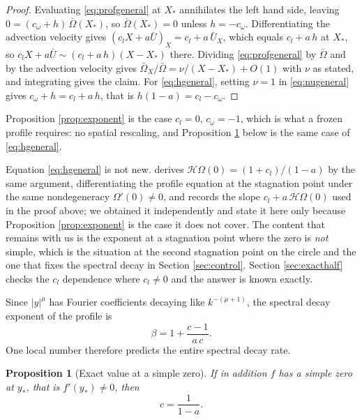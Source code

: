 \documentclass[11pt]{article}
\newtheorem{proposition}{Proposition}
\theoremstyle{definition}
\newcommand{\Hil}{\mathcal{H}}
\newcommand{\abs}[1]{\left\lvert #1 \right\rvert}
\newcommand{\Ub}{\bar{U}}
\newcommand{\Ob}{\bar{\Omega}}
\begin{document}
\begin{proof}
Evaluating \eqref{eq:profgeneral} at $X_\ast$ annihilates the left hand side,
leaving $0 = (c_\omega + h)\,\Ob(X_\ast)$, so $\Ob(X_\ast)=0$ unless
$h = -c_\omega$. Differentiating the advection velocity gives
$(c_l X + a\Ub)_X = c_l + a\,\Ub_X$, which equals $c_l + a\,h$ at $X_\ast$, so
$c_l X + a\Ub \sim (c_l + a\,h)(X-X_\ast)$ there. Dividing
\eqref{eq:profgeneral} by $\Ob$ and by the advection velocity gives
$\Ob_X/\Ob = \nu/(X-X_\ast) + O(1)$ with $\nu$ as stated, and integrating gives
the claim. For \eqref{eq:hgeneral}, setting $\nu=1$ in \eqref{eq:nugeneral}
gives $c_\omega + h = c_l + a\,h$, that is $h(1-a) = c_l - c_\omega$.
\end{proof}

Proposition \ref{prop:exponent} is the case $c_l = 0$, $c_\omega = -1$, which is
what a frozen profile requires: no spatial rescaling, and Proposition
\ref{prop:c1} below is the same case of \eqref{eq:hgeneral}.

Equation \eqref{eq:hgeneral} is not new. \cite{xu2026} derives
$\Hil\Omega(0) = (1+c_l)/(1-a)$ by the same argument, differentiating the
profile equation at the stagnation point under the same nondegeneracy
$\Omega'(0)\ne0$, and records the slope $c_l + a\,\Hil\Omega(0)$ used in the
proof above; we obtained it independently and state it here only because
Proposition \ref{prop:exponent} is the case it does not cover. The content
that remains with us is the exponent at a stagnation point where the zero is
\emph{not} simple, which is the situation at the second stagnation point on the
circle and the one that fixes the spectral decay in
Section \ref{sec:control}. Section \ref{sec:exacthalf} checks the $c_l$
dependence where $c_l\ne0$ and the answer is known exactly.

Since $\abs{y}^\mu$ has Fourier coefficients decaying like $k^{-(\mu+1)}$, the
spectral decay exponent of the profile is
\begin{equation}
  \beta = 1 + \frac{c-1}{a\,c}.
  \label{eq:beta}
\end{equation}
One local number therefore predicts the entire spectral decay rate.

\begin{proposition}[Exact value at a simple zero]
\label{prop:c1}
If in addition $f$ has a simple zero at $y_\ast$, that is $f'(y_\ast)\ne 0$,
then
\begin{equation}
  c = \frac{1}{1-a}.
  \label{eq:c1}
\end{equation}
\end{proposition}
\end{document}
